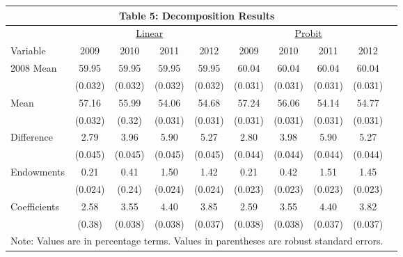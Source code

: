 \documentclass[11pt]{article}
\theoremstyle{definition}
\begin{document}
\vspace{25mm}
\noindent
\begin{center}
\begin{tabular}{l c c c c c c c c c}
\hline\hline
\multicolumn{9}{c}{\textbf{Table 5: Decomposition Results}} \\
\hline
 & \multicolumn{4}{c}{\underline{\hspace{15mm} Linear \hspace{15mm}}} & \multicolumn{4}{c}{\underline{ \hspace{15mm} Probit \hspace{15mm}}} \\
 Variable & 2009 & 2010 & 2011 & 2012 & 2009 & 2010 & 2011 & 2012 \\
\hline
2008 Mean & 59.95 & 59.95 & 59.95 & 59.95 & 60.04 & 60.04 & 60.04 & 60.04 \\
  & (0.032) & (0.032) & (0.032) & (0.032) & (0.031) & (0.031) & (0.031) & (0.031) \\
Mean & 57.16 & 55.99 & 54.06 & 54.68 & 57.24 & 56.06 & 54.14 & 54.77 \\
  & (0.032) & (0.32) & (0.031) & (0.031) & (0.031) & (0.031) & (0.031) & (0.031) \\
Difference & 2.79 & 3.96 & 5.90 & 5.27 & 2.80 & 3.98 & 5.90 & 5.27 \\
  & (0.045) & (0.045) & (0.045) & (0.045) & (0.044) & (0.044) & (0.044) & (0.044) \\
Endowments & 0.21 & 0.41 & 1.50 & 1.42 & 0.21 & 0.42 & 1.51 & 1.45 \\
  & (0.024) & (0.24) & (0.024) & (0.024) & (0.023) & (0.023) & (0.023) & (0.023) \\
Coefficients & 2.58 & 3.55 & 4.40 & 3.85 & 2.59 & 3.55 & 4.40 & 3.82 \\
  & (0.38) & (0.038) & (0.038) & (0.037) & (0.038) & (0.038) & (0.037) & (0.037) \\
\hline\hline
\multicolumn{9}{l}{Note: Values are in percentage terms. Values in parentheses are robust standard errors.} \\
\end{tabular} 
\end{center}
\end{document}
